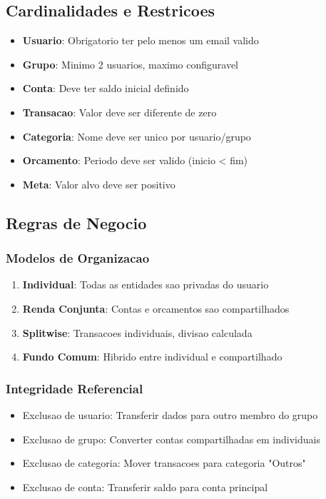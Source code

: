 \subsection{Cardinalidades e Restricoes}

\begin{itemize}
    \item \textbf{Usuario}: Obrigatorio ter pelo menos um email valido
    \item \textbf{Grupo}: Minimo 2 usuarios, maximo configuravel
    \item \textbf{Conta}: Deve ter saldo inicial definido
    \item \textbf{Transacao}: Valor deve ser diferente de zero
    \item \textbf{Categoria}: Nome deve ser unico por usuario/grupo
    \item \textbf{Orcamento}: Periodo deve ser valido (inicio < fim)
    \item \textbf{Meta}: Valor alvo deve ser positivo
\end{itemize}

\subsection{Regras de Negocio}

\subsubsection{Modelos de Organizacao}
\begin{enumerate}
    \item \textbf{Individual}: Todas as entidades sao privadas do usuario
    \item \textbf{Renda Conjunta}: Contas e orcamentos sao compartilhados
    \item \textbf{Splitwise}: Transacoes individuais, divisao calculada
    \item \textbf{Fundo Comum}: Hibrido entre individual e compartilhado
\end{enumerate}

\subsubsection{Integridade Referencial}
\begin{itemize}
    \item Exclusao de usuario: Transferir dados para outro membro do grupo
    \item Exclusao de grupo: Converter contas compartilhadas em individuais
    \item Exclusao de categoria: Mover transacoes para categoria "Outros"
    \item Exclusao de conta: Transferir saldo para conta principal
\end{itemize}
